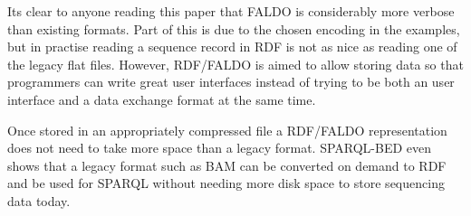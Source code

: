 Its clear to anyone reading this paper that FALDO is considerably more 
verbose than existing formats. Part of this is due to the chosen encoding
in the examples, but in practise reading a sequence record in RDF is not as
nice as reading one of the legacy flat files. However, RDF/FALDO is aimed to allow
storing data so that programmers can write great user interfaces instead of trying
to be both an user interface and a data exchange format at the same time.

Once stored in an appropriately compressed file a RDF/FALDO representation does not
need to take more space than a legacy format. SPARQL-BED even shows that a legacy
format such as BAM can be converted on demand to RDF and be used for SPARQL without 
needing more disk space to store sequencing data today.






